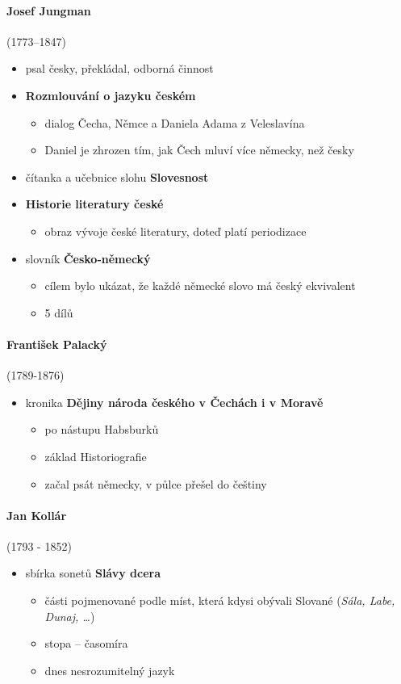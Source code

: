 \paragraph{Josef Jungman} (1773--1847)
\begin{itemize}
\item psal česky, překládal, odborná činnost
\item \textbf{Rozmlouvání o jazyku českém}
	\begin{itemize}
	\item dialog Čecha, Němce a Daniela Adama z Veleslavína
	\item Daniel je zhrozen tím, jak Čech mluví více německy, než česky
	\end{itemize}
\item čítanka a učebnice slohu \textbf{Slovesnost}
\item \textbf{Historie literatury české}
	\begin{itemize}
	\item obraz vývoje české literatury, doteď platí periodizace	
	\end{itemize}
\item slovník \textbf{Česko-německý}
	\begin{itemize}
	\item cílem bylo ukázat, že každé německé slovo má český ekvivalent
	\item 5 dílů
	\end{itemize}
\end{itemize}

\paragraph{František Palacký} (1789-1876)
\begin{itemize}
\item kronika \textbf{Dějiny národa českého v Čechách i v Moravě}
	\begin{itemize}
	\item po nástupu Habsburků
	\item základ Historiografie
	\item začal psát německy, v půlce přešel do češtiny
	\end{itemize}
\end{itemize}

\paragraph{Jan Kollár}(1793 - 1852)
\begin{itemize}
\item sbírka sonetů \textbf{Slávy dcera}
	\begin{itemize}
	\item části pojmenované podle míst, která kdysi obývali Slované (\textit{Sála, Labe, Dunaj, \ldots})
	\item stopa -- časomíra
	\item dnes nesrozumitelný jazyk
	\end{itemize}
\end{itemize}

